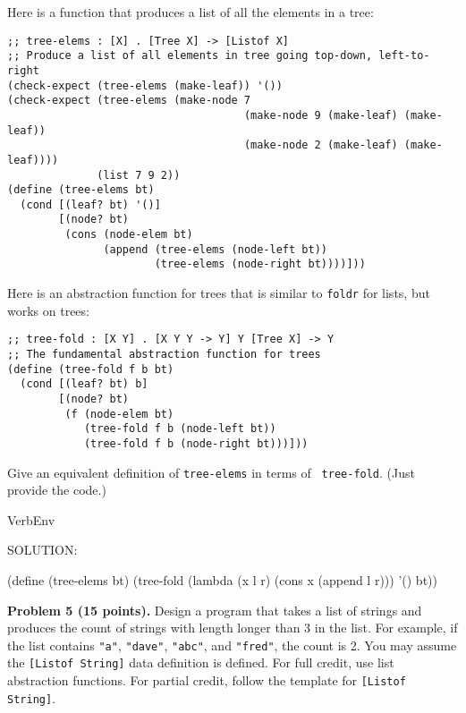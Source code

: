 \documentclass[12pt]{article}
\begin{document}




\noindent
Here is a function that produces a list of all the elements in a tree:
\begin{verbatim}
;; tree-elems : [X] . [Tree X] -> [Listof X]
;; Produce a list of all elements in tree going top-down, left-to-right
(check-expect (tree-elems (make-leaf)) '())
(check-expect (tree-elems (make-node 7 
                                     (make-node 9 (make-leaf) (make-leaf))
                                     (make-node 2 (make-leaf) (make-leaf))))
              (list 7 9 2))
(define (tree-elems bt)
  (cond [(leaf? bt) '()]
        [(node? bt)
         (cons (node-elem bt)
               (append (tree-elems (node-left bt))
                       (tree-elems (node-right bt))))]))
\end{verbatim}
Here is an abstraction function for trees that is similar to
{\tt foldr} for lists, but works on trees:
\begin{verbatim}
;; tree-fold : [X Y] . [X Y Y -> Y] Y [Tree X] -> Y
;; The fundamental abstraction function for trees
(define (tree-fold f b bt)
  (cond [(leaf? bt) b]
        [(node? bt)
         (f (node-elem bt)
            (tree-fold f b (node-left bt))
            (tree-fold f b (node-right bt)))]))
\end{verbatim}
Give an equivalent definition of {\tt tree-elems} in terms of {\tt
  tree-fold}.  (Just provide the code.)

\vspace{1em}

\begin{SaveVerbatim}{VerbEnv}


SOLUTION:

(define (tree-elems bt)
  (tree-fold (lambda (x l r) (cons x (append l r))) '() bt))

\end{SaveVerbatim}


\newpage



\newpage
\noindent
{\bf Problem 5 (15 points).}  
%
Design a program that takes a list of strings and produces the count
of strings with length longer than 3 in the list.  For example, if the
list contains {\tt "a"}, {\tt "dave"}, {\tt "abc"}, and {\tt "fred"},
the count is 2.  You may assume the {\tt{[Listof String]}} data
definition is defined.
%
For full credit, use list abstraction functions.  For partial credit,
follow the template for {\tt{[Listof String]}}.
\end{document}
